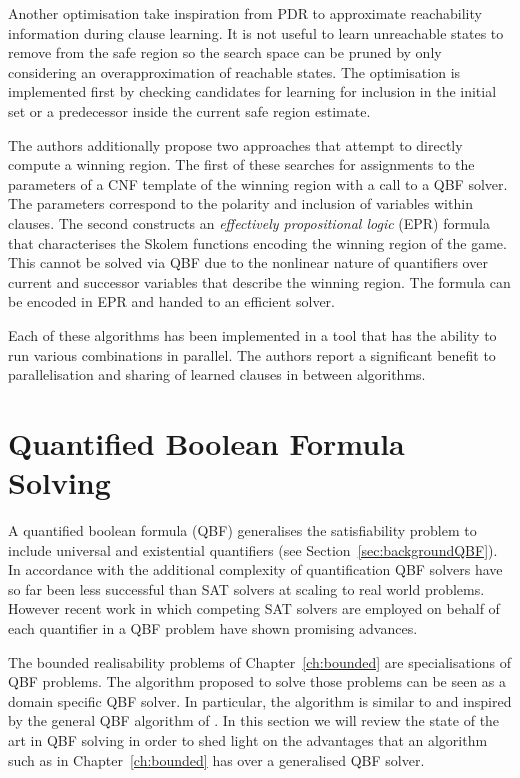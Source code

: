 Another optimisation take inspiration from PDR to approximate reachability information during clause learning. It is not useful to learn unreachable states to remove from the safe region so the search space can be pruned by only considering an overapproximation of reachable states. The optimisation is implemented first by checking candidates for learning for inclusion in the initial set or a predecessor inside the current safe region estimate.

The authors additionally propose two approaches that attempt to directly compute a winning region. The first of these searches for assignments to the parameters of a CNF template of the winning region with a call to a QBF solver. The parameters correspond to the polarity and inclusion of variables within clauses. The second constructs an \emph{effectively propositional logic} (EPR) formula that characterises the Skolem functions encoding the winning region of the game. This cannot be solved via QBF due to the nonlinear nature of quantifiers over current and successor variables that describe the winning region. The formula can be encoded in EPR and handed to an efficient solver.

Each of these algorithms has been implemented in a tool that has the ability to run various combinations in parallel. The authors report a significant benefit to parallelisation and sharing of learned clauses in between algorithms.

\section{Quantified Boolean Formula Solving}

A quantified boolean formula (QBF) generalises the satisfiability problem to include universal and existential quantifiers (see Section~\ref{sec:backgroundQBF}). In accordance with the additional complexity of quantification QBF solvers have so far been less successful than SAT solvers at scaling to real world problems. However recent work in which competing SAT solvers are employed on behalf of each quantifier in a QBF problem have shown promising advances.

The bounded realisability problems of Chapter~\ref{ch:bounded} are specialisations of QBF problems. The algorithm proposed to solve those problems can be seen as a domain specific QBF solver. In particular, the algorithm is similar to and inspired by the general QBF algorithm of \cite{Janota12}. In this section we will review the state of the art in QBF solving in order to shed light on the advantages that an algorithm such as in Chapter~\ref{ch:bounded} has over a generalised QBF solver.

